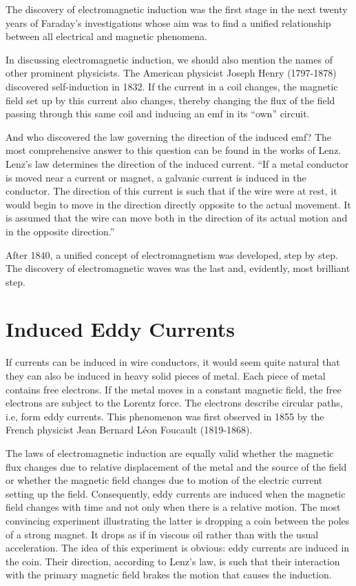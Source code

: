 The discovery of electromagnetic induction was the first stage in the next twenty years of Faraday's investigations whose aim was to find a unified relationship between all electrical and magnetic phenomena.

In discussing electromagnetic induction, we should also mention the names of other prominent physicists. The American physicist Joseph Henry (1797-1878) discovered self-induction in 1832. If the current in a coil changes, the magnetic field set up by this current also changes, thereby changing the flux of the field passing through this same coil and inducing an emf in its ``own'' circuit.

And who discovered the law governing the direction of the induced emf? The most comprehensive answer to this question can be found in the works of Lenz. Lenz's law determines the direction of the induced current. ``If a metal conductor is moved near a current or magnet, a galvanic current is induced in the conductor. The direction of this current is such that if the wire were at rest, it would begin to move in the direction directly opposite to the actual movement. It is assumed that the wire can move both in the direction of its actual motion and in the opposite direction.''

After 1840, a unified concept of electromagnetism was developed, step by step. The discovery of electromagnetic waves was the last and, evidently, most brilliant step.


\section{Induced Eddy Currents}
If currents can be induced in wire conductors, it would seem quite natural that they can also be induced in heavy solid pieces of metal. Each piece of metal contains free electrons. If the metal moves in a constant magnetic field, the free electrons are subject to the Lorentz force. The electrons describe circular paths, i.e, form eddy currents. This phenomenon was first observed in 1855 by the French physicist Jean Bernard L\'eon Foucault (1819-1868).

The laws of electromagnetic induction are equally valid whether the magnetic flux changes due to relative displacement of the metal and the source of the field or whether the magnetic field changes due to motion of the electric current setting up the field. Consequently, eddy currents are induced when the magnetic field changes with time and not only when there is a relative motion. The most convincing experiment illustrating the latter is dropping a coin between the poles of a strong
magnet. It drops as if in viscous oil rather than with the usual acceleration. The idea of this experiment is obvious: eddy currents are induced in the coin. Their direction, according to Lenz's law, is such that their interaction with the primary magnetic field brakes the motion that causes the induction.


